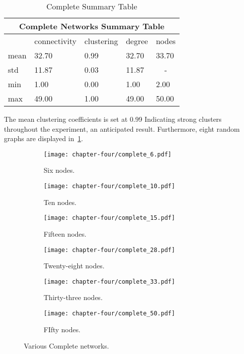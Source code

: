 \begin{table}[!hbtp]
	\centering
	\begin{adjustbox}{width=0.6\textwidth}
		\small
		\begin{tabular}{|l|l|l|l|l|}
			\hline
			\multicolumn{5}{|c|}{Complete Networks Summary Table}                     \\ \hline
			     & connectivity & clustering & degree & nodes                  \\ \hline
			mean & 32.70        & 0.99       & 32.70  & 33.70                  \\ \hline
			std  & 11.87        & 0.03       & 11.87  & \multicolumn{1}{c|}{-} \\ \hline
			min  & 1.00         & 0.00       & 1.00   & 2.00                   \\ \hline
			max  & 49.00        & 1.00       & 49.00  & 50.00                  \\ \hline
		\end{tabular}
	\end{adjustbox}
	\caption{Complete Summary Table}
	\label{complete-summary-table}
\end{table}

The mean clustering coefficients is set at 0.99 Indicating strong clusters
throughout the experiment, an anticipated result. Furthermore, eight random
graphs are displayed in~\ref{complete_networks_illustration}.

\begin{figure}[!hbtp]
	\centering
	\begin{subfigure}[t]{0.30\textwidth}
		\centering
		\texttt{[image: chapter-four/complete\_6.pdf]}
		\caption{Six nodes.}
	\end{subfigure}
	\hfill
	\begin{subfigure}[t]{0.30\textwidth}\centering
		\centering
		\texttt{[image: chapter-four/complete\_10.pdf]}
		\caption{Ten nodes.}
	\end{subfigure}
	\hfill
	\begin{subfigure}[t]{0.30\textwidth}\centering
		\centering
		\texttt{[image: chapter-four/complete\_15.pdf]}
		\caption{Fifteen nodes.}
	\end{subfigure}
	\hfill
	\begin{subfigure}[t]{0.30\textwidth}\centering
		\centering
		\texttt{[image: chapter-four/complete\_28.pdf]}
		\caption{Twenty-eight nodes.}
	\end{subfigure}
	\hfill
	\begin{subfigure}[t]{0.30\textwidth}\centering
		\centering
		\texttt{[image: chapter-four/complete\_33.pdf]}
		\caption{Thirty-three nodes.}
	\end{subfigure}
	\hfill
	\begin{subfigure}[t]{0.30\textwidth}\centering
		\centering
		\texttt{[image: chapter-four/complete\_50.pdf]}
		\caption{FIfty nodes.}
	\end{subfigure}
	\caption{Various Complete networks.}
	\label{complete_networks_illustration}
\end{figure}

